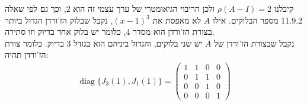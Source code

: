 \documentclass{article}
\DeclareMathOperator{\diag}{diag}
\begin{document}
קיבלנו $\rho(A-I)=2$ ולכן הריבוי הגיאומטרי של ערך עצמי זה הוא 2, וכך גם לפי שאלה 11.9.2 מספר הבלוקים.
אילו $A$ לא מאפסת את $(x-1)^3$, נקבל שבלוק הז'ורדן הגדול ביותר בצורת הז'ורדן הוא מסדר 4, כלומר יש בלוק אחד בדיוק וזו סתירה.\\
נקבל שבצורת הז'ורדן של $A$ יש שני בלוקים, והגדול ביניהם הוא בגודל 3 בדיוק. כלומר צורת הז'ורדן תהיה:
\begin{align*}
    \diag\{ J_3(1), J_1(1) \}=\begin{pmatrix}
                                  1 & 1 & 0 & 0 \\
                                  0 & 1 & 1 & 0 \\
                                  0 & 0 & 1 & 0 \\
                                  0 & 0 & 0 & 1
                              \end{pmatrix}
\end{align*}
\end{document}
